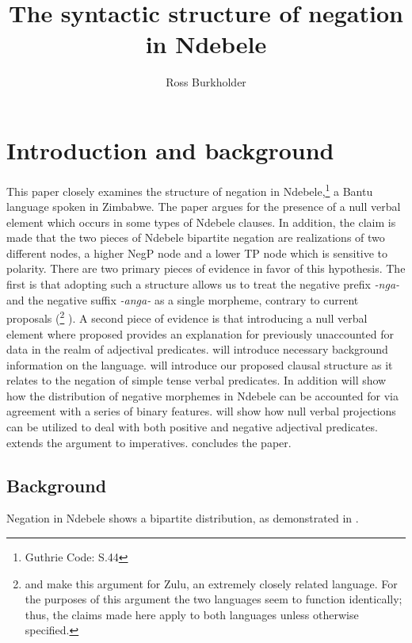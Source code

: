 \documentclass[output=paper]{langsci/langscibook}
\title{The syntactic structure of negation in Ndebele}
\author{%
 Ross Burkholder \affiliation{University of Chicago}
}
\newcommand{\nga}[0]{\textit{-nga- }}
\begin{document}
 

  

\section{Introduction and background}

This paper closely examines the structure of negation in Ndebele,\footnote{Guthrie Code: S.44} a Bantu language spoken in Zimbabwe. The paper argues for the presence of a null verbal element which occurs in some types of Ndebele clauses. In addition, the claim is made that the two pieces of Ndebele bipartite negation are realizations of two different nodes, a higher NegP node and a lower TP node which is sensitive to polarity. There are two primary pieces of evidence in favor of this hypothesis. The first is that adopting such a structure allows us to treat the negative prefix \nga and the negative suffix \textit{-anga-} as a single morpheme, contrary to current proposals (\citet{Buell2004,Buell2005}\footnote{\citet{Buell2004} and \citeyear{Buell2005} make this argument for Zulu, an extremely closely related language. For the purposes of this argument the two languages seem to function identically; thus, the claims made here apply to both languages unless otherwise specified.} \citealt{Khumalo1981,Khumalo1982,Sibanda2004}). A second piece of evidence is that introducing a null verbal element where proposed provides an explanation for previously unaccounted for data in the realm of adjectival predicates.  will introduce necessary background information on the language.   will introduce our proposed clausal structure as it relates to the negation of simple tense verbal predicates. In addition  will show how the distribution of negative morphemes in Ndebele can be accounted for via agreement with a series of binary features.  will show how null verbal projections can be utilized to deal with both positive and negative adjectival predicates.  extends the argument to imperatives.  concludes the paper. 


\subsection{Background}\label{sec:burkholder:1.1}

Negation in Ndebele shows a bipartite distribution, as demonstrated in .
\end{document}
